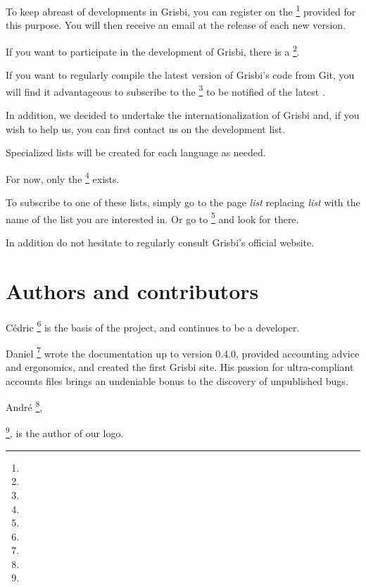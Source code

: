 To keep abreast of developments in Grisbi, you can register on the \footnote{\urlListInfoEmail{}} provided for this purpose.  You will then receive an email at the release of each new version.

If you want to participate in the development of Grisbi, there is a \footnote{\urlListDevelEmail{}}.

If you want to regularly compile the latest version of Grisbi's code from \gls{Git}, you will find it advantageous to subscribe to the \footnote{\urlListCVSEmail{}} to be notified of the latest .

In addition, we decided to undertake the internationalization of Grisbi and, if you wish to help us, you can first contact us on the development list.

Specialized lists will be created for each language as needed.

For now, only the \footnote{\urlListAnglaiseEmail{}} exists.

To subscribe to one of these lists, simply go to the page
\urlListSF{}\emph{list} replacing \emph{list} with the name of the list you are interested in. Or go to 
\footnote{\urlGrisbi{}} and look for  there.

In addition do not hesitate to regularly consult Grisbi's official website.


\newpage

\section{Authors and contributors\label{introduction-authors}}

{Cédric }\footnote{\urlCedricAugerEmail{}} is the basis of the project, and continues to be a developer.

{Daniel }\footnote{\urlDanielCartronEmail{}} wrote the documentation up to version 0.4.0, provided accounting advice and ergonomics, and created the first Grisbi site. His passion for ultra-compliant accounts files brings an undeniable bonus to the discovery of unpublished bugs.

{André }\footnote{\urlAndrePascualEmail{}},

\footnote{\urlLinuxGraphic{}}, is the author of our logo.

